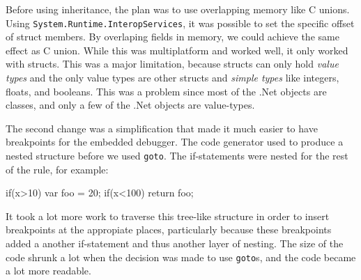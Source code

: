 Before using inheritance, the plan was to use overlapping memory like C unions. 
Using \verb|System.|\verb|Runtime.|\verb|InteropServices|, it was possible to set the specific offset of struct members.
By overlaping fields in memory, we could achieve the same effect as C union.
While this was multiplatform and worked well, it only worked with structs.
This was a major limitation, because structs can only hold \textit{value types} and the only value types are other structs and \textit{simple types} like integers, floats, and booleans.
This was a problem since most of the .Net objects are classes, and only a few of the .Net objects are value-types.

The second change was a simplification that made it much easier to have breakpoints for the embedded debugger.
The code generator used to produce a nested structure before we used \verb|goto|.
The if-statements were nested for the rest of the rule, for example:

\begin{CS}
    if(x>10){
        var foo = 20;    
        if(x<100){
            return foo;
        }
    }
\end{CS}

It took a lot more work to traverse this tree-like structure in order to insert breakpoints at the appropiate places, particularly because these breakpoints added a another if-statement and thus another layer of nesting.
The size of the code shrunk a lot when the decision was made to use \verb|goto|s, and the code became a lot more readable.

